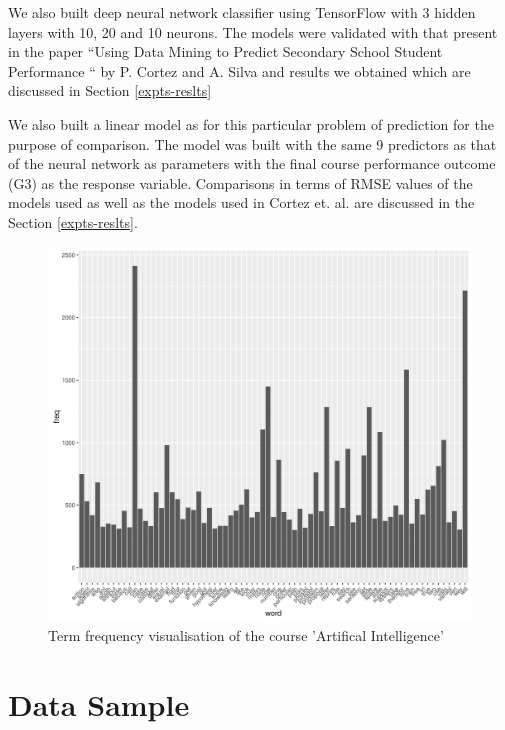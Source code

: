 \documentclass[conference]{IEEEtran}
\begin{document}
We also built deep neural network classifier using TensorFlow \cite{tensorflow2015-whitepaper} with
3 hidden layers with 10, 20 and 10 neurons. The models were validated with that present
in the paper “Using Data Mining to Predict Secondary School Student Performance “ by
P. Cortez and A. Silva and results we obtained which are discussed in Section \ref{expts-reslts}

We also built a linear model as for this particular problem of prediction for the purpose of comparison. The model was built with the same 9 predictors as that of the neural network as parameters with the final course performance outcome (G3) as the response variable.
Comparisons in terms of RMSE values of the models used as well as the models used
in Cortez et. al.\cite{ref:4} are discussed in the Section \ref{expts-reslts}.

\begin{figure}
	\includegraphics[width=\linewidth]{ai-vis.jpg}
	\caption{Term frequency visualisation of the course 'Artifical Intelligence'}
	\label{fig:ai-vis}
\end{figure}

	\section{Data Sample}
\end{document}
